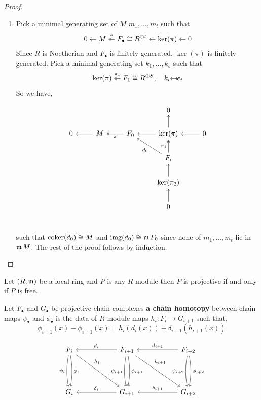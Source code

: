 \documentclass[12pt]{amsart}
\begin{document}
\begin{proof}

    \begin{enumerate}
        \item Pick a minimal generating set of $M$ $m_1, \ldots, m_t$ such that 
        \[0 \leftarrow M \overset{\pi}{\twoheadleftarrow} F_\bullet \cong R^{\oplus t} \leftarrow \ker(\pi) \leftarrow 0\]
        Since $R$ is Noetherian and $F_\bullet$ is finitely-generated, $\ker(\pi)$ is finitely-generated. Pick a minimal generating set $k_1, \ldots, k_s$ such that 
        \[ \ker(\pi) \overset{\pi_1}{\twoheadleftarrow} F_1 \iso R^{\oplus S}, \quad k_i \text{\reflectbox{$\mapsto$}} e_i\]
        So we have, 

        \[\begin{tikzcd}
            {}&{} &{} & 0 \\ 
            0 & M \ar[l] & F_0 \ar[l, two heads, "\pi"] & \ker(\pi) \ar[l] \ar[u] & 0 \ar[l] \\
            {} & {} & {} & F_i \ar[u, two heads, "\pi_1"] \ar[lu, "d_0"] \\ 
            {} & {} & {} & \ker(\pi_2) \ar[u] \\ 
            {} & {} & {} & 0 \ar[u] \\ 
        \end{tikzcd}\]

        \noindent such that $\operatorname{coker}(d_0) \cong M$ and $\operatorname{img}(d_0) \cong \operatorname{\mathfrak{m}} F_0$ since none of $m_1, \ldots, m_t$ lie in $\operatorname{\mathfrak{m}} M$. 
        The rest of the proof follows by induction. 
    \end{enumerate}
\end{proof}

\begin{theorem}[Kaplansky]
    Let $(R, \operatorname{\mathfrak{m}})$ be a local ring and  $P$ is any $R$-module then $P$ is projective if and only if $P$ is free. 
\end{theorem}

\begin{definition}
    Let  $F_\bullet$ and $G_\bullet$ be projective chain complexes \textbf{a chain homotopy} between chain maps $\psi_\bullet$ and $\phi_\bullet$ is the data of $R$-module maps $h_i: F_i \to G_{i+1}$ such that,
    \[\phi_{i+1}(x) - \phi_{i+1}(x) = h_i(d_i(x)) + \delta_{i+1}(h_{i+1}(x))\]

    \[\begin{tikzcd}
        F_i \ar[dd, bend left = -10,swap, "\psi_i"]  \ar[dd, bend left = 10, "\phi_i"] \ar[ddrr, "h_i"{xshift = -.1in, yshift=.1in}] & {} & \ar[ll, swap, "d_i"] F_{i+1} \ar[dd, bend left = -10,swap, "\psi_{i+1}"]  \ar[dd, bend left = 10, "\phi_{i+1}"] \ar[ddrr, "h_{i+1}"{xshift = -.1in, yshift=.1in}] & {} & \ar[ll, swap, "d_{i+1}"] F_{i+2}\ar[dd, bend left = -10,swap, "\psi_{i+2}"]  \ar[dd, bend left = 10, "\phi_{i+2}"]  \\ 
        {} \\ 
        G_i & {} & \ar[ll, swap, "\delta_i"] G_{i+1} & {} & \ar[ll, swap, "\delta_{i+1}"] G_{i+2} 
    \end{tikzcd}\]
\end{definition}
\end{document}
